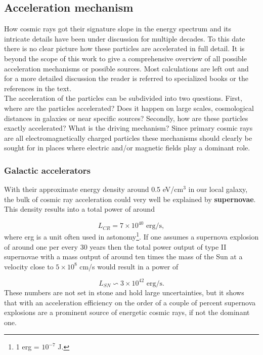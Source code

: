 \subsection{Acceleration mechanism}
How cosmic rays got their signature slope in the energy spectrum and its intricate details have been under discussion for multiple decades. To this date there is no clear picture how these particles are accelerated in full detail. It is beyond the scope of this work to give a comprehensive overview of all possible acceleration mechanisms or possible sources. Most calculations are left out and for a more detailed discussion the reader is referred to specialized books or the references in the text.\\
\newline
The acceleration of the particles can be subdivided into two questions. First, where are the particles accelerated? Does it happen on large scales, cosmological distances in galaxies or near specific sources? Secondly, how are these particles exactly accelerated? What is the driving mechanism? Since primary cosmic rays are all electromagnetically charged particles these mechanisms should clearly be sought for in places where electric and/or magnetic fields play a dominant role.

\subsubsection{Galactic accelerators}
With their approximate energy density around 0.5 eV/cm$^3$ in our local galaxy, the bulk of cosmic ray acceleration could very well be explained by \textbf{supernovae}. This density results into a total power of around

\begin{equation}
L_{CR} = 7 \times 10^{40} \textrm{ erg/s},
\end{equation}
where erg is a unit often used in astonomy\footnote{1 erg = $10^{-7}$ J.}. If one assumes a supernova explosion of around one per every 30 years then the total power output of type II supernovae with a mass output of around ten times the mass of the Sun at a velocity close to $5 \times 10^{8}$ cm/s would result in a power of

\begin{equation}
L_{SN} \backsim 3 \times 10^{42} \textrm{ erg/s}.
\end{equation}
These numbers are not set in stone and hold large uncertainties, but it shows that with an acceleration efficiency on the order of a couple of percent supernova explosions are a prominent source of energetic cosmic rays, if not the dominant one.

